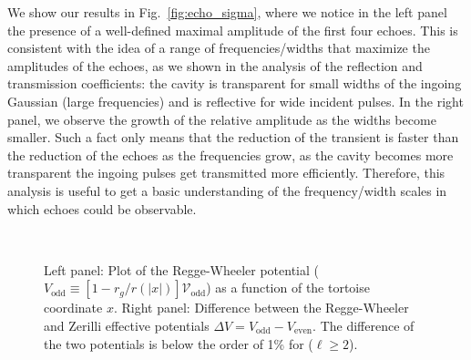 \documentclass[article,aps,nofootinbib,twocolumn,superscriptaddress]{revtex4-1}
\begin{document}
We show our results in Fig.~\ref{fig:echo_sigma}, where we notice in the left panel the presence of a well-defined maximal amplitude of the first four echoes. This is consistent with the idea of a range of frequencies/widths that maximize the amplitudes of the echoes, as we shown in the analysis of the reflection and transmission coefficients: the cavity is transparent for small widths of the ingoing Gaussian (large frequencies) and is reflective for wide incident pulses. In the right panel, we observe the growth of the relative amplitude as the widths become smaller. Such a fact only means that the reduction of the transient is faster than the reduction of the echoes as the frequencies grow, as the cavity becomes more transparent the ingoing pulses get transmitted more efficiently. Therefore, this analysis is useful to get a basic understanding of the frequency/width scales in which echoes could be observable.  

\begin{figure}
\centering
{} \,
\caption{\label{fig:evenodd_potentials} Left panel: Plot of the Regge-Wheeler potential ($V_{\mathrm{odd}}\equiv[1-r_g/r(|x|)]\mathcal{V}_{\mathrm{odd}}$) as a function of the tortoise coordinate $x$. Right panel: Difference between the Regge-Wheeler and Zerilli effective potentials $\Delta V=V_{\mathrm{odd}}-V_{\mathrm{even}}$. The difference of the two potentials is below the order of 1\% for ($\ell\geq 2$).} 
\end{figure}
\end{document}
